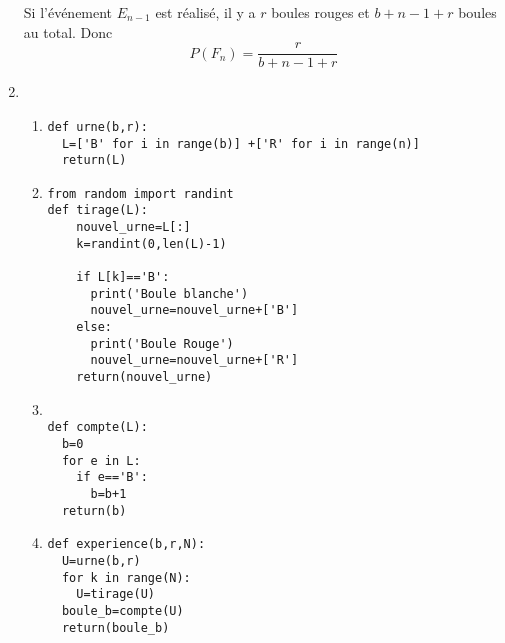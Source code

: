 \begin{exercice}
\begin{correction}
\begin{enumerate}
Si l'événement $E_{n-1}$ est réalisé, il y a  $r$ boules rouges et $b+n-1+r$ boules au total. 
Donc 
$$P(F_n) = \frac{r}{b+n-1+r}$$

\item \begin{enumerate}
\item
\begin{lstlisting}
def urne(b,r):
  L=['B' for i in range(b)] +['R' for i in range(n)]
  return(L)
\end{lstlisting}

\item
\begin{lstlisting}
from random import randint
def tirage(L):
	nouvel_urne=L[:]
	k=randint(0,len(L)-1)
	
	if L[k]=='B':
	  print('Boule blanche')
	  nouvel_urne=nouvel_urne+['B']
	else:
	  print('Boule Rouge')
	  nouvel_urne=nouvel_urne+['R']
	return(nouvel_urne)
\end{lstlisting}

\item 
\begin{lstlisting}

def compte(L):
  b=0
  for e in L:
    if e=='B':
      b=b+1
  return(b)
\end{lstlisting}

\item 
\begin{lstlisting}
def experience(b,r,N):
  U=urne(b,r)
  for k in range(N):
    U=tirage(U)
  boule_b=compte(U)
  return(boule_b)
    
\end{lstlisting}

\end{enumerate}

\end{enumerate}

\end{correction}


\end{exercice}









